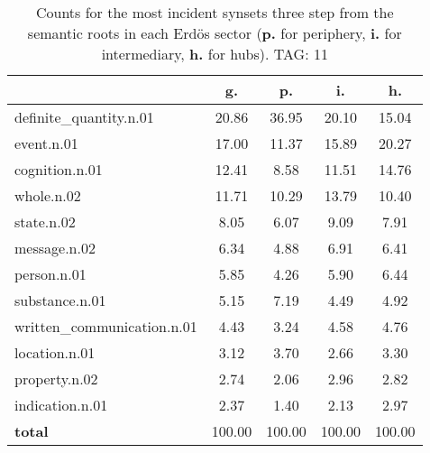 \begin{table}[h!]
\begin{center}
\begin{tabular}{| l | c | c | c | c |}\hline
 & g. & p. & i. & h. \\\hline
definite\_quantity.n.01 & 20.86  & 36.95  & 20.10  & 15.04 \\\hline
event.n.01 & 17.00  & 11.37  & 15.89  & 20.27 \\\hline
cognition.n.01 & 12.41  & 8.58  & 11.51  & 14.76 \\\hline
whole.n.02 & 11.71  & 10.29  & 13.79  & 10.40 \\\hline
state.n.02 & 8.05  & 6.07  & 9.09  & 7.91 \\\hline
message.n.02 & 6.34  & 4.88  & 6.91  & 6.41 \\\hline
person.n.01 & 5.85  & 4.26  & 5.90  & 6.44 \\\hline
substance.n.01 & 5.15  & 7.19  & 4.49  & 4.92 \\\hline
written\_communication.n.01 & 4.43  & 3.24  & 4.58  & 4.76 \\\hline
location.n.01 & 3.12  & 3.70  & 2.66  & 3.30 \\\hline
property.n.02 & 2.74  & 2.06  & 2.96  & 2.82 \\\hline
indication.n.01 & 2.37  & 1.40  & 2.13  & 2.97 \\\hline
{{\bf total}} & 100.00  & 100.00  & 100.00  & 100.00 \\\hline
\end{tabular}
\caption{Counts for the most incident synsets three step from the semantic roots in each Erd\"os sector ({\bf p.} for periphery, {\bf i.} for intermediary, {\bf h.} for hubs). TAG: 11}
\end{center}
\end{table}